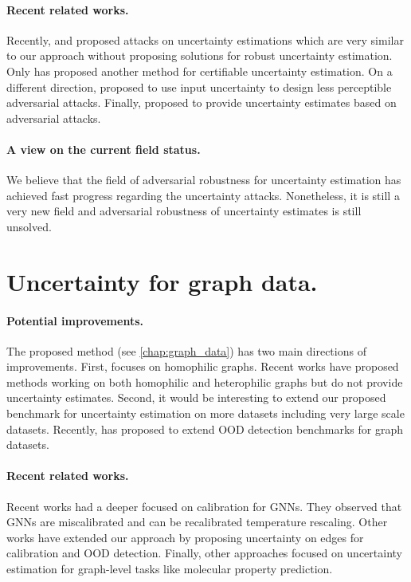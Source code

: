 \paragraph{Recent related works.} Recently, \cite{galil2021disrupting} and \cite{huimin2022attackingOOD} proposed attacks on uncertainty estimations which are very similar to our approach without proposing solutions for robust uncertainty estimation. Only \cite{meinke2021provably} has proposed another method for certifiable uncertainty estimation. On a different direction, \cite{dia2021localizeduncertainty} proposed to use input uncertainty to design less perceptible adversarial attacks. Finally, \cite{alarab2021attackucertainty} proposed to provide uncertainty estimates based on adversarial attacks.

\paragraph{A view on the current field status.} We believe that the field of adversarial robustness for uncertainty estimation has achieved fast progress regarding the uncertainty attacks. Nonetheless, it is still a very new field and adversarial robustness of uncertainty estimates is still unsolved. 

\section{Uncertainty for graph data.}

\paragraph{Potential improvements.} The proposed method \GPNacro{} (see \cref{chap:graph_data}) has two main directions of improvements. First, \GPNacro{} focuses on homophilic graphs. Recent works have proposed methods \cite{bodnar2022sheaf, giovanni2022graff} working on both homophilic and heterophilic graphs but do not provide uncertainty estimates. Second, it would be interesting to extend our proposed benchmark for uncertainty estimation on more datasets including very large scale datasets. Recently, \cite{gui2022good} has proposed to extend OOD detection benchmarks for graph datasets.


\paragraph{Recent related works.} Recent works \cite{texeira2019GNNmiscalibrated, hsu2022GNNmiscalibrated, wang2021confident} had a deeper focused on calibration for GNNs. They observed that GNNs are miscalibrated and can be recalibrated temperature rescaling. Other works \cite{zhou2022OODlink, hsu2022structure} have extended our approach by proposing uncertainty on edges for calibration and OOD detection. Finally, other approaches \cite{soleimany2021evidential} focused on uncertainty estimation for graph-level tasks like molecular property prediction.

